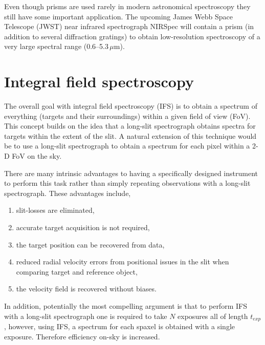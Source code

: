 
Even though prisms are used rarely in modern astronomical spectroscopy they still have some important application.
The upcoming James Webb Space Telescope (JWST) near infrared spectrograph NIRSpec will contain a prism (in addition to several diffraction gratings) to obtain low-resolution spectroscopy of a very large spectral range (0.6--5.3\,$\mu$m).


\section{Integral field spectroscopy} %
\label{sec:IFS}

The overall goal with integral field spectroscopy (IFS) is to obtain a spectrum of everything (targets and their surroundings) within a given field of view (FoV).
This concept builds on the idea that a long-slit spectrograph obtains spectra for targets within the extent of the slit.
A natural extension of this technique would be to use a long-slit spectrograph to obtain a spectrum for each pixel within a 2-D FoV on the sky.

There are many intrinsic advantages to having a specifically designed instrument to perform this task rather than simply repeating observations with a long-slit spectrograph.
These advantages include,

\begin{enumerate}
    \item slit-losses are eliminated,
    \item accurate target acquisition is not required,
    \item the target position can be recovered from data,
    \item reduced radial velocity errors from positional issues in the slit when comparing target and reference object,
    \item the velocity field is recovered without biases.
\end{enumerate}

In addition, potentially the most compelling argument is that to perform IFS with a long-slit spectrograph one is required to take $N$ exposures all of length $t_{exp}$, however, using IFS, a spectrum for each spaxel is obtained with a single exposure. Therefore efficiency on-sky is increased.


